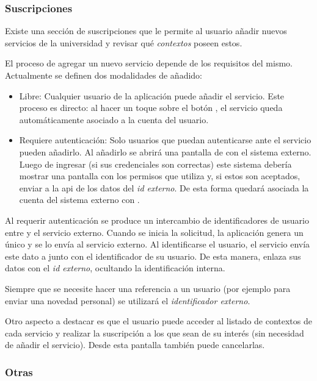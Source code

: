 \subsubsection{Suscripciones}
\label{funcionalidad_suscripciones}

Existe una sección de suscripciones que le permite al usuario añadir nuevos servicios de la universidad y revisar qué \textit{contextos} poseen estos.

El proceso de agregar un nuevo servicio depende de los requisitos del mismo. Actualmente se definen dos modalidades de añadido:
\begin{itemize}
\item Libre: Cualquier usuario de la aplicación puede añadir el servicio. Este proceso es directo: al hacer un toque sobre el botón , el servicio queda automáticamente asociado a la cuenta del usuario.
\item Requiere autenticación: Solo usuarios que puedan autenticarse ante el servicio pueden añadirlo. Al añadirlo se abrirá una pantalla de  con el sistema externo. Luego de ingresar (si sus credenciales son correctas) este sistema debería mostrar una pantalla con los permisos que utiliza y, si estos son aceptados, enviar a la \gls{api} de \nombreApp{} los datos del \textit{id externo}. De esta forma quedará asociada la cuenta del sistema externo con \nombreApp{}. 
\end{itemize}

Al requerir autenticación se produce un intercambio de identificadores de usuario entre \nombreApp{} y el servicio externo. Cuando se inicia la solicitud, la aplicación genera un  único y se lo envía al servicio externo. Al identificarse el usuario, el servicio envía este dato a \nombreApp{} junto con el identificador de su usuario. De esta manera, \nombreApp enlaza sus datos con el \textit{id externo}, ocultando la identificación interna.

Siempre que se necesite hacer una referencia a un usuario (por ejemplo para enviar una novedad personal) se utilizará el \textit{identificador externo}.

Otro aspecto a destacar es que el usuario puede acceder al listado de contextos de cada servicio y realizar la suscripción a los que sean de su interés (sin necesidad de añadir el servicio). Desde esta pantalla también puede cancelarlas.

\subsubsection{Otras}
\label{funcionalidad_otras}

